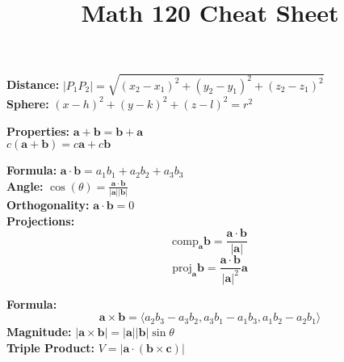 \documentclass[2pt]{article}
\title{\small \textbf{Math 120 Cheat Sheet}} %
\date{} %
\begin{document}
\maketitle
\vspace{-10pt} %
\begin{multicols}{2}

\begin{tcolorbox}[title=\textbf{3D Coordinate Systems}, colframe=lightblue]
\textbf{Distance:} $|P_1P_2| = \sqrt{(x_2 - x_1)^2 + (y_2 - y_1)^2 + (z_2 - z_1)^2}$ \\
\textbf{Sphere:} $(x-h)^2 + (y-k)^2 + (z-l)^2 = r^2$
\end{tcolorbox}

\begin{tcolorbox}[title=\textbf{Vectors}, colframe=lightgreen]
\textbf{Properties:} $\mathbf{a} + \mathbf{b} = \mathbf{b} + \mathbf{a}$ \\
$c(\mathbf{a} + \mathbf{b}) = c\mathbf{a} + c\mathbf{b}$
\end{tcolorbox}

\begin{tcolorbox}[title=\textbf{Dot Product}, colframe=lightpink]
    \textbf{Formula:} $\mathbf{a} \cdot \mathbf{b} = a_1b_1 + a_2b_2 + a_3b_3$ \\
    \textbf{Angle:} $\cos(\theta) = \frac{\mathbf{a} \cdot \mathbf{b}}{|\mathbf{a}| |\mathbf{b}|}$ \\
    \textbf{Orthogonality:} $\mathbf{a} \cdot \mathbf{b} = 0$ \\
    \textbf{Projections:} 
    \[ \text{comp}_{\mathbf{a}} \mathbf{b} = \frac{\mathbf{a} \cdot \mathbf{b}}{|\mathbf{a}|} \] 
    \[ \text{proj}_{\mathbf{a}} \mathbf{b} = \frac{\mathbf{a} \cdot \mathbf{b}}{|\mathbf{a}|^2} \mathbf{a} \] 
\end{tcolorbox}

\begin{tcolorbox}[title=\textbf{Cross Product}, colframe=lightyellow]
\textbf{Formula:}
\[ \mathbf{a} \times \mathbf{b} = \langle a_2b_3 - a_3b_2, a_3b_1 - a_1b_3, a_1b_2 - a_2b_1 \rangle \] 
\textbf{Magnitude:} $|\mathbf{a} \times \mathbf{b}| = |\mathbf{a}| |\mathbf{b}| \sin \theta$ \\
\textbf{Triple Product:} $V = |\mathbf{a} \cdot (\mathbf{b} \times \mathbf{c})|$
\end{tcolorbox}


\end{multicols}
\end{document}
